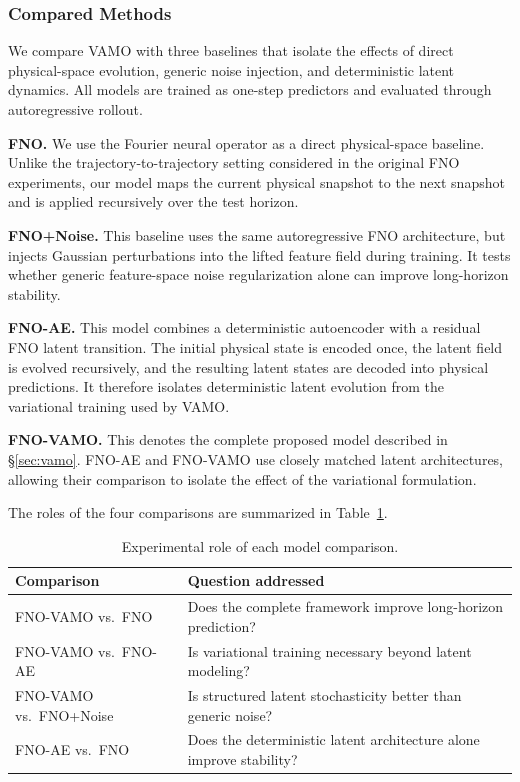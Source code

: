 \documentclass[11pt]{article}
\begin{document}
\subsubsection{Compared Methods}
\label{sec:compared_methods}
We compare VAMO with three baselines that isolate the effects of direct physical-space evolution, generic noise injection, and deterministic latent dynamics. All models are trained as one-step predictors and evaluated through autoregressive rollout. \begin{description}[topsep=2pt,itemsep=0pt]
\item\textbf{FNO.} We use the Fourier neural operator \citep{li2020fourier} as a direct physical-space baseline. Unlike the trajectory-to-trajectory setting considered in the original FNO experiments, our model maps the current physical snapshot to the next snapshot and is applied recursively over the test horizon. 
\item\textbf{FNO+Noise.} This baseline uses the same autoregressive FNO architecture, but injects Gaussian perturbations into the lifted feature field during training. It tests whether generic feature-space noise regularization alone can improve long-horizon stability. 
\item\textbf{FNO-AE.} This model combines a deterministic autoencoder with a residual FNO latent transition. The initial physical state is encoded once, the latent field is evolved recursively, and the resulting latent states are decoded into physical predictions. It therefore isolates deterministic latent evolution from the variational training used by VAMO. 
\item\textbf{FNO-VAMO.} This denotes the complete proposed model described in \S\ref{sec:vamo}. FNO-AE and FNO-VAMO use closely matched latent architectures, allowing their comparison to isolate the effect of the variational formulation. 
\end{description}
The roles of the four comparisons are summarized in Table~\ref{tab:comparison_logic}. 
\begin{table}[t] 
\centering 
\caption{ Experimental role of each model comparison. } \label{tab:comparison_logic} 
\begin{tabular}{ll} 
\toprule Comparison & Question addressed \\ 
\midrule 
FNO-VAMO vs.\ FNO & Does the complete framework improve long-horizon prediction? \\ 
FNO-VAMO vs.\ FNO-AE & Is variational training necessary beyond latent modeling? \\ 
FNO-VAMO vs.\ FNO+Noise & Is structured latent stochasticity better than generic noise? \\ 
FNO-AE vs.\ FNO & Does the deterministic latent architecture alone improve stability? \\ 
\bottomrule 
\end{tabular} 
\end{table} 
\end{document}
